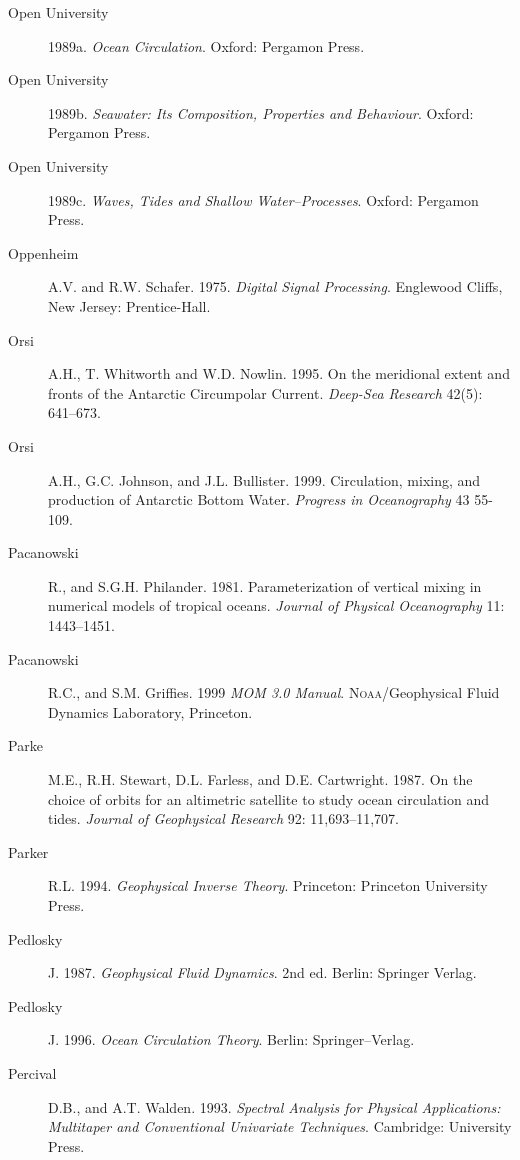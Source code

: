 \begin{description}
\item [Open University]1989a. \textit{Ocean Circulation}.  Oxford: Pergamon
Press.

\item[Open University]1989b. \textit{Seawater: Its Composition, Properties and
Behaviour}.  Oxford: Pergamon Press.

\item [Open University]1989c. \textit{Waves, Tides and Shallow
Water--Processes}.  Oxford: Pergamon Press.

\item [Oppenheim]A.V. and R.W. Schafer. 1975. \textit{Digital Signal Processing}. 
Englewood Cliffs, New Jersey: Prentice-Hall.

\item [Orsi]A.H., T. Whitworth and W.D. Nowlin. 1995. On the meridional
extent and fronts of the Antarctic Circumpolar Current. \textit{Deep-Sea Research}
42(5): 641--673.

\item [Orsi]A.H., G.C. Johnson, and J.L. Bullister. 1999. Circulation,
mixing, and production of Antarctic Bottom Water.
\textit{Progress in Oceanography} 43 55-109.

\item [Pacanowski]R., and S.G.H. Philander. 1981. Parameterization of vertical
mixing in numerical models of tropical oceans. \textit{Journal of Physical
Oceanography} 11: 1443--1451.

\item [Pacanowski]R.C., and S.M. Griffies. 1999 \textit{MOM 3.0 Manual}.
\textsc{Noaa}/Geophysical Fluid Dynamics Laboratory, Princeton.

\item [Parke]M.E., R.H. Stewart, D.L. Farless, and D.E. Cartwright. 1987. On
the choice of orbits for an altimetric satellite to study ocean circulation and
tides. \textit{Journal of Geophysical Research} 92: 11,693--11,707.

\item [Parker]R.L. 1994. \textit{Geophysical Inverse Theory}. Princeton:
Princeton University Press.

\item [Pedlosky]J. 1987. \textit{Geophysical Fluid Dynamics}. 2nd ed.
Berlin: Springer Verlag.

\item [Pedlosky]J. 1996. \textit{Ocean Circulation Theory}.  Berlin:
Springer--Verlag.

\item [Percival]D.B., and A.T. Walden. 1993. \textit{Spectral Analysis for
Physical Applications: Multitaper and Conventional Univariate Techniques}. 
Cambridge: University Press.


\end{description}
